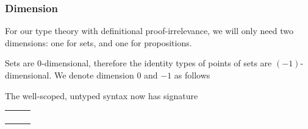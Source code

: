 \begin{frame}
  \frametitle{Dimension}

  \pause For our type theory with definitional proof-irrelevance, we will
  only need two dimensions: one for sets, and one for propositions.

  \pause Sets are $0$-dimensional, therefore the identity types of points of
  sets are $(-1)$-dimensional. We denote dimension $0$ and $-1$ as follows

  \pause {}
  \begin{tightcenter}
    \begin{prooftree}
    \end{prooftree}
    \hspace{5em}
    \begin{prooftree}
    \end{prooftree}
  \end{tightcenter}

  \pause The well-scoped, untyped syntax now has signature
  \begin{tightcenter}
    \begin{tabular}{@{}l@{}l@{}l@{}}
         \dimdeclentry{\Ctx}{\AgdSet}
      \\ \dimdeclentry{\Var}{\AgdArr{\Ctx}{\AgdArr{\Dim}{\AgdSet}}}
      \\ \dimdeclentry{\Typ}{\AgdArr{\Ctx}{\AgdArr{\Dim}{\AgdSet}}}
      \\ \dimdeclentry{\Trm}{\AgdArr{\Ctx}{\AgdArr{\Dim}{\AgdSet}}}
    \end{tabular}
  \end{tightcenter}
\end{frame}

